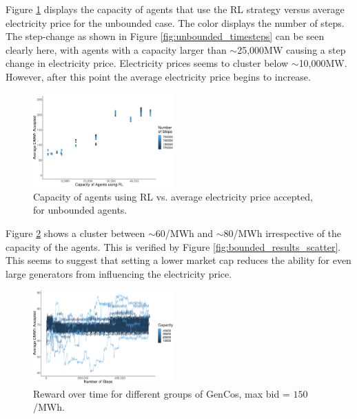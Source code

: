 \documentclass[conference]{IEEEtran}
\begin{document}
Figure \ref{fig:unbounded_results_scatter} displays the capacity of agents that use the RL strategy versus average electricity price for the unbounded case. The color displays the number of steps. The step-change as shown in Figure \ref{fig:unbounded_timesteps} can be seen clearly here, with agents with a capacity larger than ${\sim}$25,000MW causing a step change in electricity price. Electricity prices seems to cluster below ${\sim}$10,000MW. However, after this point the average electricity price begins to increase.



\begin{figure}
    \includegraphics[width=0.48\textwidth]{figures/results/unbounded_results_scatter.pdf}
    \caption{Capacity of agents using RL vs. average electricity price accepted, for unbounded agents.}
    \label{fig:unbounded_results_scatter}
\end{figure}



Figure \ref{fig:bounded_timesteps} shows a cluster between ${\sim}$\textsterling$60$/MWh and ${\sim}$\textsterling$80$/MWh irrespective of the capacity of the agents. This is verified by Figure \ref{fig:bounded_results_scatter}. This seems to suggest that setting a lower market cap reduces the ability for even large generators from influencing the electricity price.


\begin{figure}
    \includegraphics[width=0.48\textwidth]{figures/results/bounded_results.pdf}
    \caption{Reward over time for different groups of GenCos, max bid = \textsterling $150$/MWh.}
    \label{fig:bounded_timesteps}
\end{figure}
\end{document}
